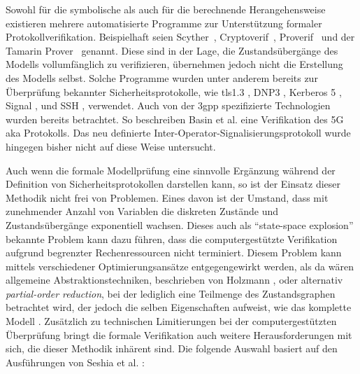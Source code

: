 Sowohl für die symbolische als auch für die berechnende Herangehensweise existieren mehrere automatisierte Programme zur Unterstützung formaler Protokollverifikation.
Beispielhaft seien Scyther~\cite{cremers2008scyther}, Cryptoverif~\cite{blanchet2007cryptoverif}, Proverif~\cite{blanchet2010proverif} und der Tamarin Prover~\cite{meier2013tamarin} genannt.
Diese sind in der Lage, die Zustandsübergänge des Modells vollumfänglich zu verifizieren, übernehmen jedoch nicht die Erstellung des Modells selbst.
Solche Programme wurden unter anderem bereits zur Überprüfung bekannter Sicherheitsprotokolle, wie \gls{tls}1.3 \cite{cremers2017comprehensive}, DNP3 \cite{cremers2017secure}, Kerberos 5 \cite{blanchet2008computationally}, Signal \cite{kobessi2017automated}, und SSH \cite{cade2013computationally}, verwendet.
Auch von der \gls{3gpp} spezifizierte Technologien wurden bereits betrachtet.
So beschreiben Basin et al. \cite{basin2018formal} eine Verifikation des 5G \gls{aka} Protokolls. 
Das neu definierte Inter-Operator-Signalisierungsprotokoll wurde hingegen bisher nicht auf diese Weise untersucht.

Auch wenn die formale Modellprüfung eine sinnvolle Ergänzung während der Definition von Sicherheitsprotokollen darstellen kann, so ist der Einsatz dieser Methodik nicht frei von Problemen.
Eines davon ist der Umstand, dass mit zunehmender Anzahl von Variablen die diskreten Zustände und Zustandsübergänge exponentiell wachsen.
Dieses auch als ``state-space explosion'' bekannte Problem kann dazu führen, dass die computergestützte Verifikation aufgrund begrenzter Rechenressourcen nicht terminiert.
Diesem Problem kann mittels verschiedener Optimierungsansätze entgegengewirkt werden, als da wären allgemeine Abstraktionstechniken, beschrieben von Holzmann \cite{holzmann1998designing}, oder alternativ \textit{partial-order reduction}, bei der lediglich eine Teilmenge des Zustandsgraphen betrachtet wird, der jedoch die selben Eigenschaften aufweist, wie das komplette Modell \cite{peled1993all}.
Zusätzlich zu technischen Limitierungen bei der computergestützten Überprüfung bringt die formale Verifikation auch weitere Herausforderungen mit sich, die dieser Methodik inhärent sind.
Die folgende Auswahl basiert auf den Ausführungen von Seshia et al. \cite{seshia2018model}:

